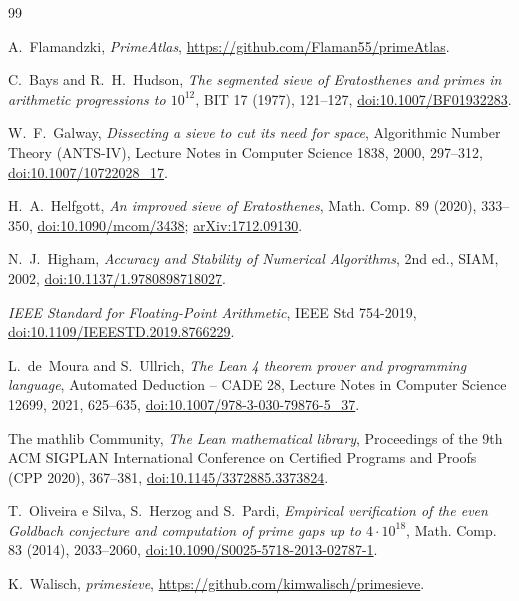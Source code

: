 \documentclass[11pt]{amsart}
\theoremstyle{definition}
\begin{document}
\begin{thebibliography}{99}

A.~Flamandzki,
\emph{PrimeAtlas},
\url{https://github.com/Flaman55/primeAtlas}.

C.~Bays and R.~H.~Hudson,
\emph{The segmented sieve of Eratosthenes and primes in arithmetic progressions to $10^{12}$},
BIT 17 (1977), 121--127,
\href{https://doi.org/10.1007/BF01932283}{doi:10.1007/BF01932283}.

W.~F.~Galway,
\emph{Dissecting a sieve to cut its need for space},
Algorithmic Number Theory (ANTS-IV), Lecture Notes in Computer Science 1838, 2000, 297--312,
\href{https://doi.org/10.1007/10722028_17}{doi:10.1007/10722028\_17}.

H.~A.~Helfgott,
\emph{An improved sieve of Eratosthenes},
Math. Comp. 89 (2020), 333--350,
\href{https://doi.org/10.1090/mcom/3438}{doi:10.1090/mcom/3438};
\href{https://arxiv.org/abs/1712.09130}{arXiv:1712.09130}.

N.~J.~Higham,
\emph{Accuracy and Stability of Numerical Algorithms}, 2nd ed., SIAM, 2002,
\href{https://doi.org/10.1137/1.9780898718027}{doi:10.1137/1.9780898718027}.

\emph{IEEE Standard for Floating-Point Arithmetic}, IEEE Std 754-2019,
\href{https://doi.org/10.1109/IEEESTD.2019.8766229}{doi:10.1109/IEEESTD.2019.8766229}.

L.~de~Moura and S.~Ullrich,
\emph{The Lean 4 theorem prover and programming language},
Automated Deduction -- CADE 28, Lecture Notes in Computer Science 12699, 2021, 625--635,
\href{https://doi.org/10.1007/978-3-030-79876-5_37}{doi:10.1007/978-3-030-79876-5\_37}.

The mathlib Community,
\emph{The Lean mathematical library},
Proceedings of the 9th ACM SIGPLAN International Conference on Certified Programs and Proofs
(CPP 2020), 367--381,
\href{https://doi.org/10.1145/3372885.3373824}{doi:10.1145/3372885.3373824}.

T.~Oliveira e Silva, S.~Herzog and S.~Pardi,
\emph{Empirical verification of the even Goldbach conjecture and computation of prime gaps up
to $4\cdot 10^{18}$},
Math. Comp. 83 (2014), 2033--2060,
\href{https://doi.org/10.1090/S0025-5718-2013-02787-1}{doi:10.1090/S0025-5718-2013-02787-1}.

K.~Walisch,
\emph{primesieve},
\url{https://github.com/kimwalisch/primesieve}.


\end{thebibliography}
\end{document}
